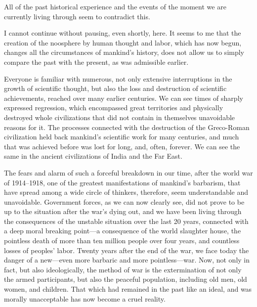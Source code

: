 \Section %
All of the past historical experience and the events of the moment we are
currently living through seem to contradict this.

I cannot continue without pausing, even shortly, here.  It seems to me that the
creation of the noosphere by human thought and labor, which has now begun,
changes all the circumstances of mankind's history, does not allow us to simply
compare the past with the present, as was admissible earlier.

Everyone is familiar with numerous, not only extensive interruptions in the
growth of scientific thought, but also the loss and destruction of scientific
achievements, reached over many earlier centuries.  We can see times of sharply
expressed regression, which encompassed great territories and physically
destroyed whole civilizations that did not contain in themselves unavoidable
reasons for it.  The processes connected with the destruction of the
Greco-Roman civilization held back mankind's scientific work for many
centuries, and much that was achieved before was lost for long, and, often,
forever.  We can see the same in the ancient civilizations of India and the Far
East.

The fears and alarm of such a forceful breakdown in our time, after the world
war of 1914--1918, one of the greatest manifestations of mankind's barbarism,
that have spread among a wide circle of thinkers, therefore, seem
understandable and unavoidable.  Government forces, as we can now clearly see,
did not prove to be up to the situation after the war's dying out, and we have
been living through the consequences of the unstable situation over the last 20
years, connected with a deep moral breaking point---a consequence of the world
slaughter house, the pointless death of more than ten million people over four
years, and countless losses of peoples' labor.  Twenty years after the end of
the war, we face today the danger of a new---even more barbaric and more
pointless---war.  Now, not only in fact, but also ideologically, the method of
war is the extermination of not only the armed participants, but also the
peaceful population, including old men, old women, and children.  That which
had remained in the past like an ideal, and was morally unacceptable has now
become a cruel reality.


